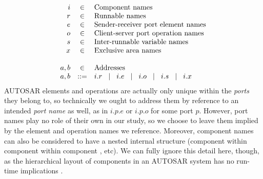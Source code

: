 \documentclass[10pt,conference]{IEEEtran}
\begin{document}
%
\[
\begin{array}{rcll}
  i & \in & \text{Component names} \\
  r & \in & \text{Runnable names} \\
  e & \in & \text{Sender-receiver port element names} \\
  o & \in & \text{Client-server port operation names} \\
  s & \in & \text{Inter-runnable variable names} \\
  x & \in & \text{Exclusive area names} \\
\\
  a,b & \in & \text{Addresses} \\
  a,b & ::= & i.r  \hspace{2ex}|\hspace{2ex}  i.e   \hspace{2ex}|\hspace{2ex} i.o   \hspace{2ex}|\hspace{2ex}   i.s   \hspace{2ex}|\hspace{2ex}   i.x   \\
\end{array}
\]
%
AUTOSAR elements and operations are actually only unique within the {\em ports} they belong to, so technically we ought to address them by reference to an intended {\em port name} as well, as in $i.p.e$ or $i.p.o$ for some port $p$. However, port names play no role of their own in our study, so we choose to leave them implied by the element and operation names we reference. Moreover, component names  can also be considered to have a nested internal structure (component  within component  within component , etc). We can fully ignore this detail here, though, as the hierarchical layout of components in an AUTOSAR system has no run-time implications \cite[ch.~3.3.1]{AR:SWC}.
\end{document}
